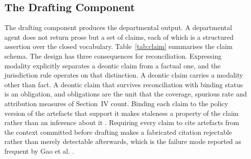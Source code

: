 \documentclass[journal]{IEEEtran}
\begin{document}
\subsection{The Drafting Component}

The drafting component produces the departmental output. A departmental agent does not return prose but a set of claims, each of which is a structured assertion over the closed vocabulary. Table~\ref{tab:claim} summarises the claim schema. The design has three consequences for reconciliation. Expressing modality explicitly separates a deontic claim from a factual one, and the jurisdiction rule operates on that distinction. A deontic claim carries a modality other than fact. A deontic claim that survives reconciliation with binding status is an obligation, and obligations are the unit that the coverage, spurious rate and attribution measures of Section~IV count. Binding each claim to the policy version of the artefacts that support it makes staleness a property of the claim rather than an inference about it \cite{vu2024freshllms}. Requiring every claim to cite artefacts from the context committed before drafting makes a fabricated citation rejectable rather than merely detectable afterwards, which is the failure mode reported as frequent by Gao et al. \cite{gao2023citations}.
\end{document}
